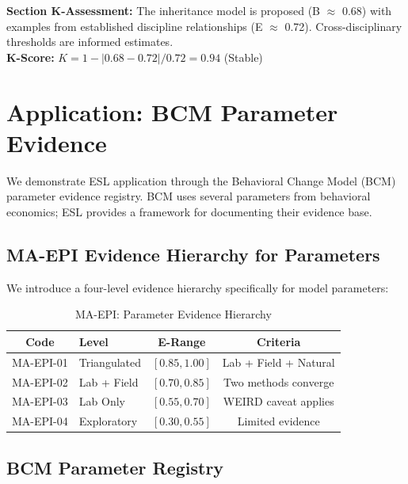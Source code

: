 \documentclass[11pt,a4paper]{article}
\begin{document}
\begin{eslbox}
\textbf{Section K-Assessment:} The inheritance model is proposed
(B $\approx$ 0.68) with examples from established discipline relationships
(E $\approx$ 0.72). Cross-disciplinary thresholds are informed estimates. \\
\textbf{K-Score:} $K = 1 - |0.68 - 0.72| / 0.72 = 0.94$ (Stable)
\end{eslbox}

\section{Application: BCM Parameter Evidence}

We demonstrate ESL application through the Behavioral Change Model (BCM)
parameter evidence registry. BCM uses several parameters from behavioral
economics; ESL provides a framework for documenting their evidence base.

\subsection{MA-EPI Evidence Hierarchy for Parameters}

We introduce a four-level evidence hierarchy specifically for model
parameters:

\begin{table}[h]
\centering
\caption{MA-EPI: Parameter Evidence Hierarchy}
\label{tab:MA-EPI}
\begin{tabular}{clcc}
\toprule
\textbf{Code} & \textbf{Level} & \textbf{E-Range} & \textbf{Criteria} \\
\midrule
MA-EPI-01 & Triangulated & $[0.85, 1.00]$ & Lab + Field + Natural \\
MA-EPI-02 & Lab + Field & $[0.70, 0.85]$ & Two methods converge \\
MA-EPI-03 & Lab Only & $[0.55, 0.70]$ & WEIRD caveat applies \\
MA-EPI-04 & Exploratory & $[0.30, 0.55]$ & Limited evidence \\
\bottomrule
\end{tabular}
\end{table}

\subsection{BCM Parameter Registry}
\end{document}
